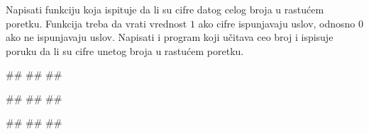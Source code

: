 \begin{Exercise}[label=p1.4_14] 
Napisati funkciju  koja ispituje da li su
cifre datog celog broja u rastućem poretku. Funkcija treba da vrati
vrednost $1$ ako cifre ispunjavaju uslov, odnosno $0$ ako ne
ispunjavaju uslov. Napisati i program koji učitava ceo broj i ispisuje
poruku da li su cifre unetog broja u rastućem poretku.

\begin{miditest}
\begin{upotreba}{1}
#\naslovInt#
##
##
\end{upotreba}
\end{miditest}
\begin{miditest}
\begin{upotreba}{2}
#\naslovInt#
##
##
\end{upotreba}
\end{miditest}

\begin{miditest}
\begin{upotreba}{3}
#\naslovInt#
##
##
\end{upotreba}
\end{miditest}

\end{Exercise}
\begin{Answer}[ref=p1.4_14]
\end{Answer}


